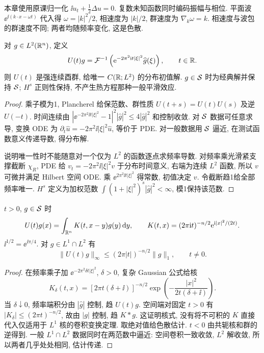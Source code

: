 \label{ch:schrodinger}
本章使用原课归一化 $\ii u_t+\tfrac12\Delta u=0$. 复数未知函数同时编码振幅与相位. 平面波 $\ee^{\ii(k\cdot x-\omega t)}$ 代入得 $\omega=|k|^2/2$, 相速度为 $|k|/2$, 群速度为 $\nabla_k\omega=k$. 相速度与波包的群速度不同; 两者均随频率变化, 这是色散.
\begin{theorem}\label{thm:schroL2}
对 $g\in L^2(\mathbb R^n)$, 定义
\[
U(t)g=\mathcal F^{-1}\left(\mathrm e^{-2\pi^2\mathrm i t|\xi|^2}\widehat g(\xi)\right),\qquad t\in\mathbb R.
\]
则 $U(t)$ 是强连续酉群, 给唯一 $C(\mathbb R;L^2)$ 的分布初值解. $g\in\mathcal S$ 时为经典解并保持 $\mathcal S$; $H^s$ 正则性保持, 不产生热方程那种一般平滑效应.
\end{theorem}
\begin{proof}
乘子模为1, Plancherel 给保范数、群性质 $U(t+s)=U(t)U(s)$ 及逆 $U(-t)$. 时间连续由 $|\ee^{-2\pi^2\ii t|\xi|^2}-1|^2|\widehat g|^2\le4|\widehat g|^2$ 和控制收敛. 对 $\mathcal S$ 数据可任意求导, 变换 ODE 为 $\partial_t\widehat u=-2\pi^2\ii|\xi|^2\widehat u$, 等价于 PDE. 对一般数据用 $\mathcal S$ 逼近, 在测试函数意义传递导数, 得分布解.

说明唯一性时不能随意对一个仅为 $L^2$ 的函数逐点求频率导数. 对频率乘光滑紧支撑截断 $\chi_R$, PDE 给 $v_t=-2\pi^2\ii|\xi|^2v$ 于分布时间意义, 右端为连续 $L^2$ 函数, 所以 $v$ 可微并满足 Hilbert 空间 ODE. 乘 $\ee^{2\pi^2\ii t|\xi|^2}$ 得常数, 初值决定 $v$. 令截断趋1给全部频率唯一. $H^s$ 定义为加权范数 $\int(1+|\xi|^2)^s|\widehat g|^2<\infty$, 模1保持该范数.
\end{proof}
\begin{theorem}\label{thm:schrokernel}
$t>0$, $g\in\mathcal S$ 时
\[
U(t)g(x)=\int_{\mathbb R^n}K(t,x-y)g(y)\,\mathrm d y,
\qquad K(t,x)=(2\pi\mathrm i t)^{-n/2}\mathrm e^{\mathrm i|x|^2/(2t)}.
\]
$\ii^{1/2}=\ee^{\ii\pi/4}$. 对 $g\in L^1\cap L^2$ 有
\[
\|U(t)g\|_\infty\le(2\pi |t|)^{-n/2}\|g\|_1,\qquad t\ne0.
\]
\end{theorem}
\begin{proof}
在频率乘子加 $\ee^{-2\pi^2\delta t|\xi|^2}$, $\delta>0$, 复杂 Gaussian 公式给核
\[
K_\delta(t,x)=[2\pi t(\delta+\ii)]^{-n/2}
\exp\left(-\frac{|x|^2}{2t(\delta+\ii)}\right).
\]
当 $\delta\downarrow0$, 频率端积分由 $|\widehat g|$ 控制, 趋 $U(t)g$. 空间端对固定 $t>0$ 有 $|K_\delta|\le(2\pi t)^{-n/2}$, 故由 $|g|$ 控制, 趋 $K*g$. 这证明核式, 没有将不可积的 $K$ 直接代入仅适用于 $L^1$ 核的卷积变换定理. 取绝对值给色散估计. $t<0$ 由共轭核和群的逆得到. 一般 $L^1\cap L^2$ 数据同时在两范数中逼近: 空间卷积一致收敛, $L^2$ 解收敛, 所以两者几乎处处相同, 估计传递.
\end{proof}
